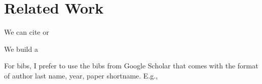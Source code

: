 \section{Related Work}


We can cite \tmpcite{} or \cite{ma2025dbox}

We build a \sys{}



For bibs, I prefer to use the bibs from Google Scholar that comes with the format of author last name, year, paper shortname. E.g., \cite{ma2025dbox}